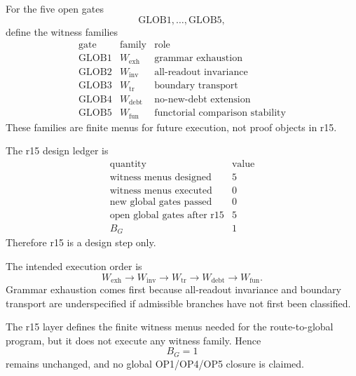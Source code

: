 \begin{definition}
For the five open gates
\[
    \mathrm{GLOB1},\ldots,\mathrm{GLOB5},
\]
define the witness families
\[
\begin{array}{c|c|l}
\text{gate} & \text{family} & \text{role}\\
\hline
\mathrm{GLOB1} & W_{\mathrm{exh}} & \text{grammar exhaustion}\\
\mathrm{GLOB2} & W_{\mathrm{inv}} & \text{all-readout invariance}\\
\mathrm{GLOB3} & W_{\mathrm{tr}} & \text{boundary transport}\\
\mathrm{GLOB4} & W_{\mathrm{debt}} & \text{no-new-debt extension}\\
\mathrm{GLOB5} & W_{\mathrm{fun}} & \text{functorial comparison stability}
\end{array}
\]
These families are finite menus for future execution, not proof objects in r15.
\end{definition}

\begin{proposition}
The r15 design ledger is
\[
\begin{array}{c|r}
\text{quantity} & \text{value}\\
\hline
\text{witness menus designed} & 5\\
\text{witness menus executed} & 0\\
\text{new global gates passed} & 0\\
\text{open global gates after r15} & 5\\
B_G & 1
\end{array}
\]
Therefore r15 is a design step only.
\end{proposition}

\begin{definition}
The intended execution order is
\[
    W_{\mathrm{exh}}
    \longrightarrow
    W_{\mathrm{inv}}
    \longrightarrow
    W_{\mathrm{tr}}
    \longrightarrow
    W_{\mathrm{debt}}
    \longrightarrow
    W_{\mathrm{fun}}.
\]
Grammar exhaustion comes first because all-readout invariance and boundary
transport are underspecified if admissible branches have not first been
classified.
\end{definition}

\begin{theorem}
The r15 layer defines the finite witness menus needed for the route-to-global
program, but it does not execute any witness family.  Hence
\[
    B_G=1
\]
remains unchanged, and no global OP1/OP4/OP5 closure is claimed.
\end{theorem}

